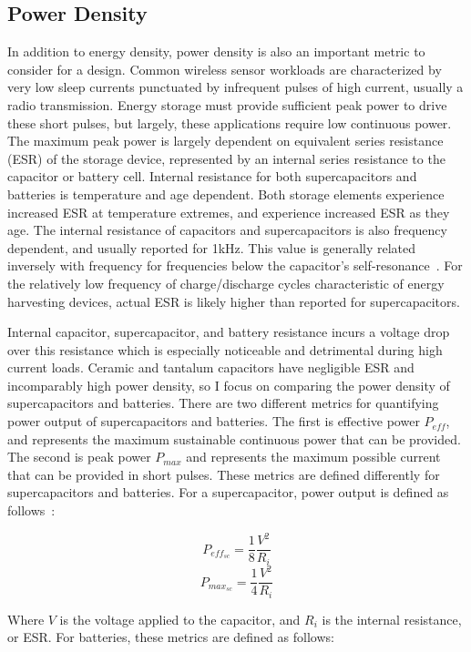 
\subsection{Power Density}
In addition to energy density, power density is also an important metric to consider for a design. 
Common wireless sensor workloads are characterized by very low sleep currents punctuated by infrequent pulses of high current, usually a radio transmission. Energy storage must provide sufficient peak power to drive these short pulses, but largely, these applications require low continuous power. The maximum peak power is largely dependent on equivalent series resistance (ESR) of the storage device, represented by an internal series resistance to the capacitor or battery cell. 
Internal resistance for both supercapacitors and batteries is temperature and age dependent. Both storage elements experience increased ESR at temperature extremes, and experience increased ESR as they age.
The internal resistance of capacitors and supercapacitors is also frequency dependent, and usually reported for 1\si{\kilo\hertz}. This value is generally related inversely with frequency for frequencies below the capacitor's self-resonance~\cite{murataESRArticle}. For the relatively low frequency of charge/discharge cycles characteristic of energy harvesting devices, actual ESR is likely higher than reported for supercapacitors.

Internal capacitor, supercapacitor, and battery resistance incurs a voltage drop over this resistance which is especially noticeable and detrimental during high  current loads.
Ceramic and tantalum capacitors have negligible ESR and incomparably high power density, so I focus on comparing the power density of supercapacitors and batteries.
There are two different metrics for quantifying power output of supercapacitors and batteries. The first is effective power $P_{eff}$, and represents the maximum sustainable continuous power that can be provided. The second is peak power $P_{max}$ and represents the maximum possible current that can be provided in short pulses. These metrics are defined differently for supercapacitors and batteries. For a supercapacitor, power output is defined as follows~\cite{IEC62391}:

$$P_{eff_{sc}} = \frac{1}{8} \frac{V^2}{R_i}$$
$$P_{max_{sc}} = \frac{1}{4} \frac{V^2}{R_i}$$

\noindent Where $V$ is the voltage applied to the capacitor, and $R_i$ is the internal resistance, or ESR. For batteries, these metrics are defined as follows:

